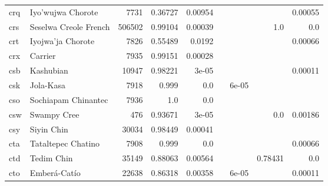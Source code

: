 \documentclass[11pt]{article}
\begin{document}
\begin{table*}[h]
{\begin{tabular}{llrrrrrrr}
crq         & Iyo'wujwa Chorote         & 7731         & 0.36727         & 0.00954         &          &          &          & 0.00055         \\

crs         & Seselwa Creole French         & 506502         & 0.99104         & 0.00039         &          &          & 1.0         & 0.0         \\

crt         & Iyojwa'ja Chorote         & 7826         & 0.55489         & 0.0192         &          &          &          & 0.00066         \\

crx         & Carrier         & 7935         & 0.99151         & 0.00028         &          &          &          &          \\

csb         & Kashubian         & 10947         & 0.98221         & 3e-05         &          &          &          & 0.00011         \\

csk         & Jola-Kasa         & 7918         & 0.999         & 0.0         &          & 6e-05         &          &          \\

cso         & Sochiapam Chinantec         & 7936         & 1.0         & 0.0         &          &          &          &          \\

csw         & Swampy Cree         & 476         & 0.93671         & 3e-05         &          &          & 0.0         & 0.00186         \\

csy         & Siyin Chin         & 30034         & 0.98449         & 0.00041         &          &          &          &          \\

cta         & Tataltepec Chatino         & 7908         & 0.999         & 0.0         &          &          &          & 0.00066         \\

ctd         & Tedim Chin         & 35149         & 0.88063         & 0.00564         &          &          & 0.78431         & 0.0         \\

cto         & Emberá-Catío         & 22638         & 0.86318         & 0.00358         &          & 6e-05         &          & 0.00011         \\


\end{tabular}}
\end{table*}
\end{document}
